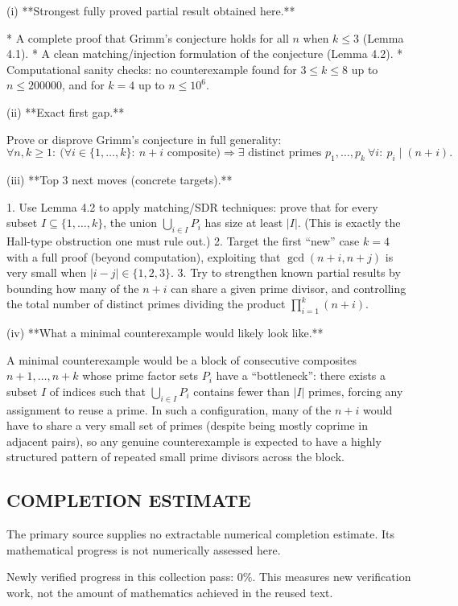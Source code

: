 (i) **Strongest fully proved partial result obtained here.**

* A complete proof that Grimm’s conjecture holds for all \(n\) when \(k\le 3\) (Lemma 4.1).
* A clean matching/injection formulation of the conjecture (Lemma 4.2).
* Computational sanity checks: no counterexample found for \(3\le k\le 8\) up to \(n\le 200000\), and
  for \(k=4\) up to \(n\le 10^6\).

(ii) **Exact first gap.**

Prove or disprove Grimm’s conjecture in full generality:
\[
\forall n,k\ge 1:\ \bigl(\forall i\in\{1,\dots,k\}:\ n+i\text{ composite}\bigr)\Rightarrow
\exists\text{ distinct primes }p_1,\dots,p_k\ \forall i:\ p_i\mid(n+i).
\]

(iii) **Top 3 next moves (concrete targets).**

1. Use Lemma 4.2 to apply matching/SDR techniques: prove that for every subset
   \(I\subseteq\{1,\dots,k\}\), the union \(\bigcup_{i\in I} P_i\) has size at least \(|I|\).
   (This is exactly the Hall-type obstruction one must rule out.)
2. Target the first “new” case \(k=4\) with a full proof (beyond computation), exploiting that
   \(\gcd(n+i,n+j)\) is very small when \(|i-j|\in\{1,2,3\}\).
3. Try to strengthen known partial results by bounding how many of the \(n+i\) can share a given
   prime divisor, and controlling the total number of distinct primes dividing the product
   \(\prod_{i=1}^k(n+i)\).

(iv) **What a minimal counterexample would likely look like.**

A minimal counterexample would be a block of consecutive composites \(n+1,\dots,n+k\) whose prime
factor sets \(P_i\) have a “bottleneck”: there exists a subset \(I\) of indices such that
\(\bigcup_{i\in I} P_i\) contains fewer than \(|I|\) primes, forcing any assignment to reuse a prime.
In such a configuration, many of the \(n+i\) would have to share a very small set of primes (despite
being mostly coprime in adjacent pairs), so any genuine counterexample is expected to have a highly
structured pattern of repeated small prime divisors across the block.


\subsection*{COMPLETION ESTIMATE}
The primary source supplies no extractable numerical completion estimate. Its mathematical progress is not numerically assessed here.

Newly verified progress in this collection pass: $0\%$. This measures new verification work, not the amount of mathematics achieved in the reused text.
